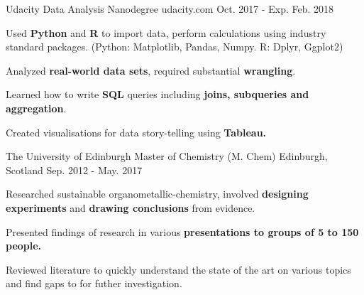 


\begin{cventries}
    \cventry
      {Udacity} %
      {Data Analysis Nanodegree} %
      {udacity.com} %
      {Oct. 2017 - Exp. Feb. 2018} %
      {
        \begin{cvitems} %
          \item {Used \textbf{Python} and \textbf{R} to import data, perform calculations using industry standard packages. (Python: Matplotlib, Pandas, Numpy. R: Dplyr, Ggplot2)}
          \item {Analyzed \textbf{real-world data sets}, required substantial \textbf{wrangling}.}
          \item {Learned how to write \textbf{SQL} queries including \textbf{joins, subqueries and aggregation}.}
          \item {Created visualisations for data story-telling using \textbf{Tableau.}}
        \end{cvitems}
      }

  \cventry
    {The University of Edinburgh} %
    {Master of Chemistry (M. Chem)} %
    {Edinburgh, Scotland} %
    {Sep. 2012 - May. 2017} %
    {
      \begin{cvitems} %
        \item {Researched sustainable organometallic-chemistry, involved \textbf{designing experiments} and \textbf{drawing conclusions} from evidence.}
        \item {Presented findings of research in various \textbf{presentations to groups of 5 to 150 people.}}
        \item {Reviewed literature to quickly understand the state of the art on various topics and find gaps to for futher investigation.}
      \end{cvitems}
    }

\end{cventries}

